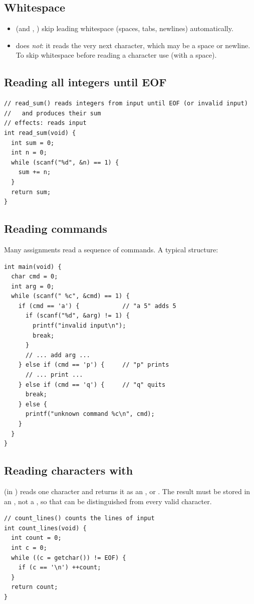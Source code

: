 \subsection{Whitespace}

\begin{itemize}
  \item {} (and , ) skip leading whitespace (spaces, tabs, newlines)
    automatically.
  \item {} does \emph{not}: it reads the very next character, which may be a space or
    newline. To skip whitespace before reading a character use  (with a space).
\end{itemize}

\subsection{Reading all integers until EOF}

\begin{lstlisting}[style=c]
// read_sum() reads integers from input until EOF (or invalid input)
//   and produces their sum
// effects: reads input
int read_sum(void) {
  int sum = 0;
  int n = 0;
  while (scanf("%d", &n) == 1) {
    sum += n;
  }
  return sum;
}
\end{lstlisting}

\subsection{Reading commands}

Many assignments read a sequence of commands. A typical structure:
\begin{lstlisting}[style=c]
int main(void) {
  char cmd = 0;
  int arg = 0;
  while (scanf(" %c", &cmd) == 1) {
    if (cmd == 'a') {            // "a 5" adds 5
      if (scanf("%d", &arg) != 1) {
        printf("invalid input\n");
        break;
      }
      // ... add arg ...
    } else if (cmd == 'p') {     // "p" prints
      // ... print ...
    } else if (cmd == 'q') {     // "q" quits
      break;
    } else {
      printf("unknown command %c\n", cmd);
    }
  }
}
\end{lstlisting}

\subsection{Reading characters with }

 (in ) reads one character and returns it as an , or
. The result must be stored in an , not a , so that  can
be distinguished from every valid character.
\begin{lstlisting}[style=c]
// count_lines() counts the lines of input
int count_lines(void) {
  int count = 0;
  int c = 0;
  while ((c = getchar()) != EOF) {
    if (c == '\n') ++count;
  }
  return count;
}
\end{lstlisting}

